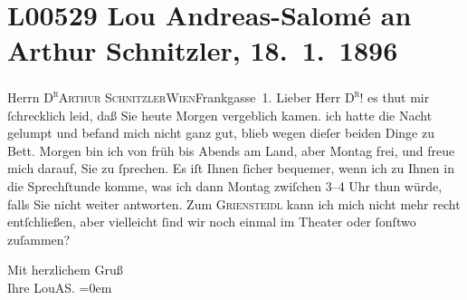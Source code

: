 

\section[Lou Andreas-Salomé an Arthur Schnitzler, 18. 1. 1896]{L00529 Lou Andreas-Salomé an Arthur Schnitzler, 18. 1. 1896}
\nopagebreak{}
\rehead{ }\normalsize\beginnumbering{}
\toendnotes[C]{\smallbreak\pagebreak[2]}
\pstart{}{\pb}Herrn \textsc{D\textsuperscript{r}}\pend{}\pstart{}\textsc{Arthur Schnitzler}\pend{}\pstart{}\textsc{Wien}\pend{}\pstart{}Frankgasse 1. \pend{}{\bigskip}\vspace{1em}
\pstart
           \noindent{}{\pb}Lieber Herr \textsc{D\textsuperscript{r}}! es thut mir ſchrecklich leid, daß Sie heute Morgen vergeblich
               kamen. ich hatte die Nacht gelumpt und befand mich nicht ganz gut, blieb wegen dieſer
               beiden Dinge zu Bett. Morgen bin ich von früh bis Abends am Land, aber Montag frei,
               und freue mich darauf, Sie zu ſprechen. Es iſt Ihnen ſicher bequemer, wenn ich zu
               Ihnen in die Sprechſtunde komme, was ich dann Montag zwiſchen 3–4 Uhr
               thun würde, falls Sie nicht weiter antworten. Zum \textsc{Griensteidl} kann ich mich nicht mehr recht entſchließen, aber vielleicht ſind wir noch
               einmal im Theater oder ſonſtwo zuſammen?\pend
           
\pstart
           Mit herzlichem Gruß{\\[\baselineskip]}Ihre \spacefill\mbox{LouAS.}\pend
           \leftskip=0em{}\endnumbering{}  
      